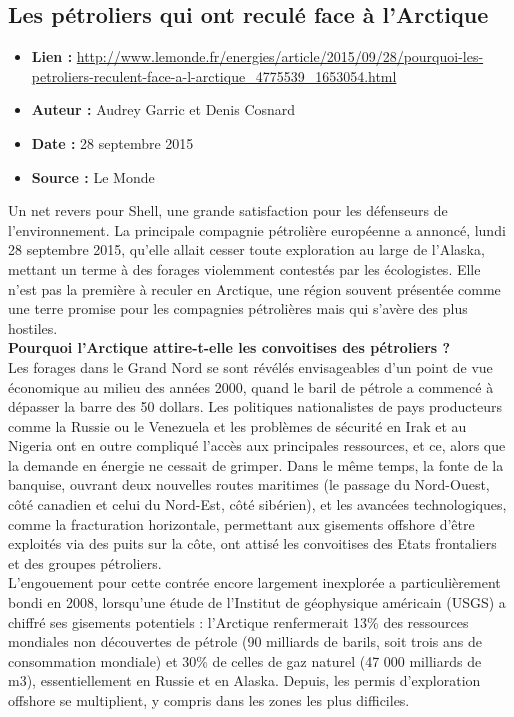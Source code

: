 \documentclass[8pt]{article}
\begin{document}
\subsection{Les pétroliers qui ont reculé face à l’Arctique}

\begin{itemize}
	\item \textbf{Lien : }  \url{http://www.lemonde.fr/energies/article/2015/09/28/pourquoi-les-petroliers-reculent-face-a-l-arctique_4775539_1653054.html} 
	\item \textbf{Auteur : }  Audrey Garric et Denis Cosnard 
	\item \textbf{Date : } 28 septembre 2015
	\item \textbf{Source : } Le Monde
\end{itemize}


Un net revers pour Shell, une grande satisfaction pour les défenseurs de l’environnement. La principale compagnie pétrolière européenne a annoncé, lundi 28 septembre 2015, qu’elle allait cesser toute exploration au large de l’Alaska, mettant un terme à des forages violemment contestés par les écologistes. Elle n’est pas la première à reculer en Arctique, une région souvent présentée comme une terre promise pour les compagnies pétrolières mais qui s’avère des plus hostiles.\\

\textbf{Pourquoi l’Arctique attire-t-elle les convoitises des pétroliers ?}\\

Les forages dans le Grand Nord se sont révélés envisageables d’un point de vue économique au milieu des années 2000, quand le baril de pétrole a commencé à dépasser la barre des 50 dollars. Les politiques nationalistes de pays producteurs comme la Russie ou le Venezuela et les problèmes de sécurité en Irak et au Nigeria ont en outre compliqué l’accès aux principales ressources, et ce, alors que la demande en énergie ne cessait de grimper. Dans le même temps, la fonte de la banquise, ouvrant deux nouvelles routes maritimes (le passage du Nord-Ouest, côté canadien et celui du Nord-Est, côté sibérien), et les avancées technologiques, comme la fracturation horizontale, permettant aux gisements offshore d’être exploités via des puits sur la côte, ont attisé les convoitises des Etats frontaliers et des groupes pétroliers.\\

L’engouement pour cette contrée encore largement inexplorée a particulièrement bondi en 2008, lorsqu’une étude de l’Institut de géophysique américain (USGS) a chiffré ses gisements potentiels : l’Arctique renfermerait 13\% des ressources mondiales non découvertes de pétrole (90 milliards de barils, soit trois ans de consommation mondiale) et 30\% de celles de gaz naturel (47 000 milliards de m3), essentiellement en Russie et en Alaska. Depuis, les permis d’exploration offshore se multiplient, y compris dans les zones les plus difficiles.\\
\end{document}
